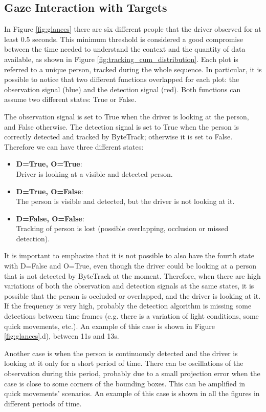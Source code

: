 \subsection{Gaze Interaction with Targets}
In Figure \ref{fig:glances} there are six different people that the driver 
observed for at least 0.5 seconds. This minimum threshold is considered a good 
compromise between the time needed to understand the context and the quantity 
of data available, as shown in Figure \ref{fig:tracking_cum_distribution}.
Each plot is referred to a unique person, tracked during the whole sequence.
In particular, it is possible to notice that two different functions overlapped
for each plot:
the observation signal (blue) and the detection signal (red).
Both functions can assume two different states: True or False.

The observation signal is set to True when the driver is looking at the person, 
and False otherwise. The detection signal is set to True when the person is 
correctly detected and tracked by ByteTrack; otherwise it is set to False.
Therefore we can have three different states:
\begin{itemize}
    \addtolength\itemsep{-2mm}
    \item \textbf{D=True, O=True}:\\
    Driver is looking at a visible and detected person.
    \item \textbf{D=True, O=False}:\\
    The person is visible and detected, but the driver is not looking at it.
    \item{\textbf{D=False, O=False}}:\\
    Tracking of person is lost (possible overlapping, occlusion or missed detection).
\end{itemize}
It is important to emphasize that it is not possible to also have the fourth state 
with D=False and O=True, even though the driver could be looking at a person that 
is not detected by ByteTrack at the moment. Therefore, when there are high 
variations of both the observation and detection signals at the same states, 
it is possible that the person is occluded or overlapped, and the driver is 
looking at it. If the frequency is very high, probably the detection algorithm 
is missing some detections between time frames (e.g. there is a variation of 
light conditions, some quick movements, etc.). An example of this case is shown 
in Figure \ref{fig:glances}.d), between 11s and 13s.

Another case is when the person is continuously detected and the driver is looking 
at it only for a short period of time. There can be oscillations of the observation 
during this period, probably due to a small projection error when the case is close 
to some corners of the bounding boxes. This can be amplified in quick movements' 
scenarios. An example of this case is shown in all the figures in different 
periods of time.

